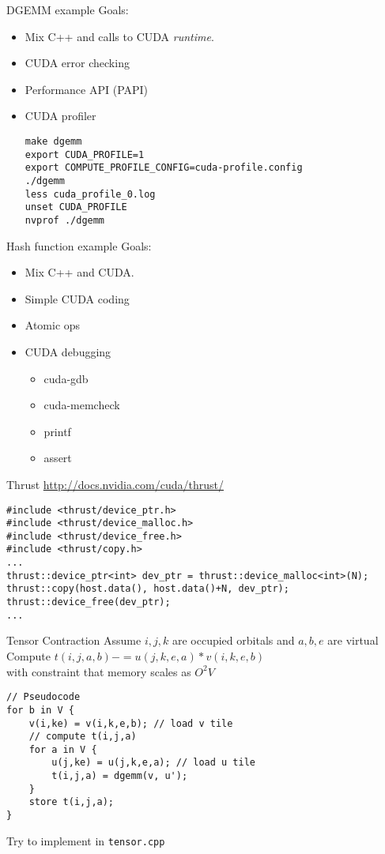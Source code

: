 \documentclass{beamer}
\begin{document}
\begin{frame}[fragile]{DGEMM example}
Goals:
\begin{itemize}
  \item Mix C++ and calls to CUDA {\em runtime}.
  \item CUDA error checking
  \item Performance API (PAPI)
  \item CUDA profiler
\begin{verbatim}
make dgemm
export CUDA_PROFILE=1
export COMPUTE_PROFILE_CONFIG=cuda-profile.config
./dgemm
less cuda_profile_0.log
unset CUDA_PROFILE
nvprof ./dgemm
\end{verbatim}
\end{itemize}
\end{frame}


\begin{frame}[fragile]{Hash function example}
Goals:
\begin{itemize}
  \item Mix C++ and CUDA.
  \item Simple CUDA coding
  \item Atomic ops
  \item CUDA debugging
    \begin{itemize}
      \item cuda-gdb
      \item cuda-memcheck
      \item printf
      \item assert
    \end{itemize}
\end{itemize}
\end{frame}

\begin{frame}[fragile]{Thrust}
\url{http://docs.nvidia.com/cuda/thrust/}
\begin{verbatim}
#include <thrust/device_ptr.h>
#include <thrust/device_malloc.h>
#include <thrust/device_free.h>
#include <thrust/copy.h>
...
thrust::device_ptr<int> dev_ptr = thrust::device_malloc<int>(N);
thrust::copy(host.data(), host.data()+N, dev_ptr);
thrust::device_free(dev_ptr);
...
\end{verbatim}
\end{frame}


\begin{frame}[fragile]{Tensor Contraction}
Assume $i,j,k$ are occupied orbitals and $a,b,e$ are virtual \\
Compute $t(i,j,a,b) -= u(j,k,e,a)*v(i,k,e,b)$ \\
with constraint that memory scales as $O^2V$
\begin{verbatim}
// Pseudocode
for b in V {
    v(i,ke) = v(i,k,e,b); // load v tile
    // compute t(i,j,a)
    for a in V {
        u(j,ke) = u(j,k,e,a); // load u tile
        t(i,j,a) = dgemm(v, u');
    }
    store t(i,j,a);
}
\end{verbatim}
Try to implement in {\tt tensor.cpp}
\end{frame}
\end{document}
